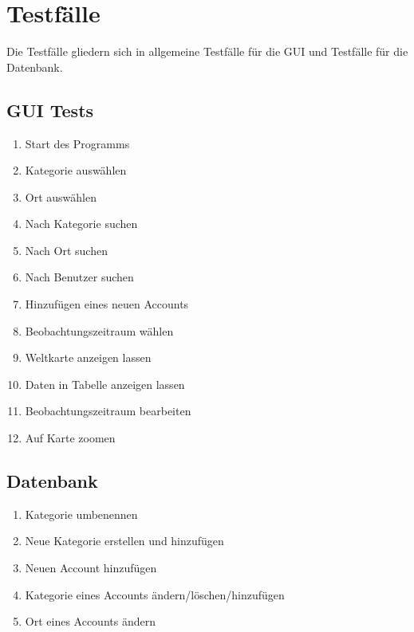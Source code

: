 
\section{Testfälle}

Die Testfälle gliedern sich in allgemeine Testfälle für die GUI und Testfälle für die Datenbank.

	\subsection{GUI Tests}
	\begin{enumerate}[align=left, label={\textbf{\textbackslash T10\arabic*0\textbackslash}} ]
	\item Start des Programms
	\item Kategorie auswählen
	\item Ort auswählen
	\item Nach Kategorie suchen
	\item Nach Ort suchen
	\item Nach Benutzer suchen
	\item Hinzufügen eines neuen Accounts
	\item Beobachtungszeitraum wählen
	\item Weltkarte anzeigen lassen
	\item Daten in Tabelle anzeigen lassen
	\item Beobachtungszeitraum bearbeiten
	\item Auf Karte zoomen
	\end{enumerate}
	
	\subsection{Datenbank}
	\begin{enumerate}[align=left, label={\textbf{\textbackslash T20\arabic*0\textbackslash}} ]
		\item Kategorie umbenennen
		\item Neue Kategorie erstellen und hinzufügen
		\item Neuen Account hinzufügen
		\item Kategorie eines Accounts ändern/löschen/hinzufügen
		\item Ort eines Accounts ändern
	\end{enumerate}

